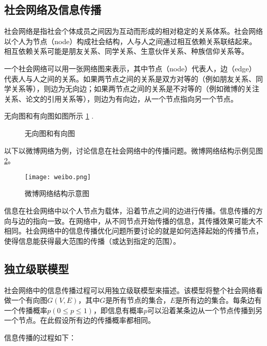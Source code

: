 \documentclass[UTF8]{ctexart}
\begin{document}
\subsection{社会网络及信息传播}
社会网络是指社会个体成员之间因为互动而形成的相对稳定的关系体系。社会网络以个人为节点（node）构成社会结构，人与人之间通过相互依赖关系联结起来。相互依赖关系可能是朋友关系、同学关系、生意伙伴关系、种族信仰关系等。

一个社会网络可以用一张网络图来表示，其中节点（node）代表人，边（edge）代表人与人之间的关系。如果两节点之间的关系是双方对等的（例如朋友关系、同学关系等），则边为无向边；如果两节点之间的关系是不对等的（例如微博的关注关系、论文的引用关系等），则边为有向边，从一个节点指向另一个节点。

无向图和有向图如图所示 \ref{graphy} .

\begin{figure}[h!]
	\centering
	\hspace{0.1in} 
	\caption{无向图和有向图}
	\label{graphy} %
\end{figure}

以下以微博网络为例，讨论信息在社会网络中的传播问题。微博网络结构示例见图 \ref{weibo}。

\begin{figure}[h!]
	\centering
	\texttt{[image: weibo.png]}
	\caption{微博网络结构示意图}
	\label{weibo}
\end{figure}

信息在社会网络中以个人节点为载体，沿着节点之间的边进行传播。信息传播的方向与边的指向一致。在网络中，从不同节点开始传播的信息，其传播效果可能大不相同。社会网络中的信息传播优化问题所要讨论的就是如何选择起始的传播节点，使得信息能获得最大范围的传播（或达到指定的范围）。

\subsection{独立级联模型}
社会网络中的信息传播过程可以用独立级联模型来描述。该模型将整个社会网络看做一个有向图$G(V,E)$，其中$G$是所有节点的集合，$E$是所有边的集合。每条边有一个传播概率$p (0 \leqslant p \leqslant 1)$，即信息有概率$p$可以沿着某条边从一个节点传播到另一个节点。在此假设所有边的传播概率都相同。

信息传播的过程如下：
\end{document}
